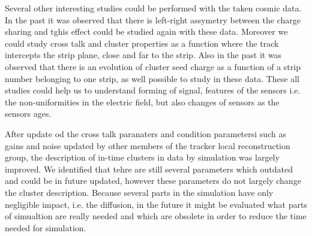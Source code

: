 

Several other interesting studies could be performed with the taken cosmic data. In the past it was observed that there is left-right assymetry between the charge sharing and tghis effect could be studied again with these data. Moreover we could study cross talk and cluster properties as a function where the track intercepts the strip plane, close and far to the strip. Also in the past it was observed that there is an evolution of cluster seed charge as a function of a strip number belonging to one strip, as well possible to study in these data.  These all studies could help us to understand forming of signal, features of the sensors i.e. the non-uniformities in the electric field, but also changes of sensors as the sensors ages. 


After update od the cross talk paranaters and condition parametersi such as gains and noise updated by other members of the tracker local reconstruction group, the description of in-time clusters in data by simulation was largely improved. We identified that tehre are still several parameters which outdated and could be in future updated, however these parameters do not largely change the cluster description. Because several parts in the simulation have only negligible impact, i.e. the diffusion, in the future it might be evaluated what parts of simualtion are really needed and which are obsolete in order to reduce the time needed for simulation.

